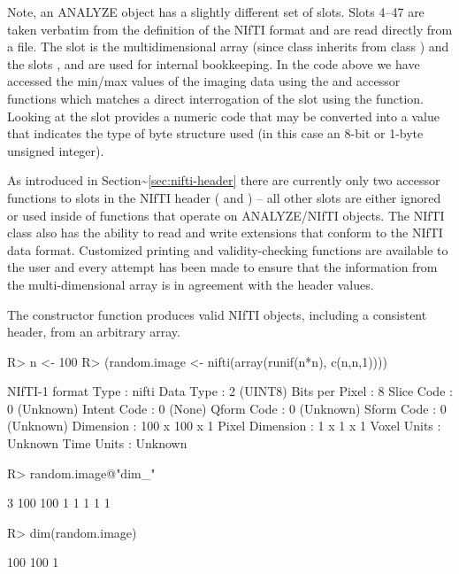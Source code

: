 \documentclass[
]{article}
\begin{document}
Note, an ANALYZE object has a slightly different set of slots. Slots
4--47 are taken verbatim from the definition of the NIfTI format and are
read directly from a file. The slot  is the multidimensional
array (since class  inherits from class ) and
the slots ,  and  are used
for internal bookkeeping. In the code above we have accessed the min/max
values of the imaging data using the  and 
accessor functions which matches a direct interrogation of the
 slot using the  function. Looking at the
 slot provides a numeric code that may be converted into
a value that indicates the type of byte structure used (in this case an
8-bit or 1-byte unsigned integer).

As introduced in Section\textasciitilde{}\ref{sec:nifti-header} there
are currently only two accessor functions to slots in the NIfTI header
( and ) -- all other slots are either
ignored or used inside of functions that operate on ANALYZE/NIfTI
objects. The NIfTI class also has the ability to read and write
extensions that conform to the NIfTI data format. Customized printing
and validity-checking functions are available to the user and every
attempt has been made to ensure that the information from the
multi-dimensional array is in agreement with the header values.

The constructor function  produces valid NIfTI objects,
including a consistent header, from an arbitrary array.

\begin{CodeChunk}

\begin{CodeInput}
R> n <- 100
R> (random.image <- nifti(array(runif(n*n), c(n,n,1))))
\end{CodeInput}

\begin{CodeOutput}
NIfTI-1 format
  Type            : nifti
  Data Type       : 2 (UINT8)
  Bits per Pixel  : 8
  Slice Code      : 0 (Unknown)
  Intent Code     : 0 (None)
  Qform Code      : 0 (Unknown)
  Sform Code      : 0 (Unknown)
  Dimension       : 100 x 100 x 1
  Pixel Dimension : 1 x 1 x 1
  Voxel Units     : Unknown
  Time Units      : Unknown
\end{CodeOutput}

\begin{CodeInput}
R> random.image@"dim_"
\end{CodeInput}

\begin{CodeOutput}
[1]   3 100 100   1   1   1   1   1
\end{CodeOutput}

\begin{CodeInput}
R> dim(random.image)
\end{CodeInput}

\begin{CodeOutput}
[1] 100 100   1
\end{CodeOutput}
\end{CodeChunk}
\end{document}
